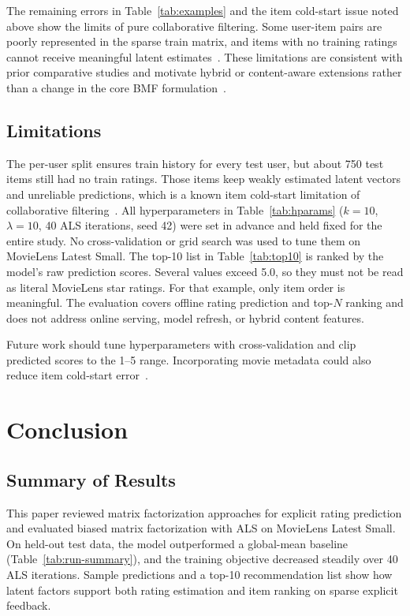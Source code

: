 \documentclass[conference]{IEEEtran}
\begin{document}
The remaining errors in Table~\ref{tab:examples} and the item cold-start issue noted above show the limits of pure collaborative filtering. Some user-item pairs are poorly represented in the sparse train matrix, and items with no training ratings cannot receive meaningful latent estimates~\cite{ref10}. These limitations are consistent with prior comparative studies and motivate hybrid or content-aware extensions rather than a change in the core BMF formulation~\cite{ref4,ref10}.

\subsection{Limitations}

The per-user split ensures train history for every test user, but about 750 test items still had no train ratings. Those items keep weakly estimated latent vectors and unreliable predictions, which is a known item cold-start limitation of collaborative filtering~\cite{ref10}. All hyperparameters in Table~\ref{tab:hparams} ($k=10$, $\lambda=10$, 40 ALS iterations, seed 42) were set in advance and held fixed for the entire study. No cross-validation or grid search was used to tune them on MovieLens Latest Small. The top-10 list in Table~\ref{tab:top10} is ranked by the model's raw prediction scores. Several values exceed 5.0, so they must not be read as literal MovieLens star ratings. For that example, only item order is meaningful. The evaluation covers offline rating prediction and top-$N$ ranking and does not address online serving, model refresh, or hybrid content features.

Future work should tune hyperparameters with cross-validation and clip predicted scores to the 1--5 range. Incorporating movie metadata could also reduce item cold-start error~\cite{ref4,ref10}.

\section{Conclusion}

\subsection{Summary of Results}

This paper reviewed matrix factorization approaches for explicit rating prediction and evaluated biased matrix factorization with ALS on MovieLens Latest Small. On held-out test data, the model outperformed a global-mean baseline (Table~\ref{tab:run-summary}), and the training objective decreased steadily over 40 ALS iterations. Sample predictions and a top-10 recommendation list show how latent factors support both rating estimation and item ranking on sparse explicit feedback.
\end{document}
